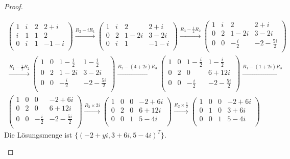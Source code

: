 \begin{proof}
	\begin{parts}
		\item 
			\begin{gather*}
			\left(
\begin{array}{ccc|c}
 1 & i & 2 & 2+i \\
 i & 1 & 1 & 2 \\
 0 & i & 1 & -1-i \\
\end{array}
\right) \xrightarrow{R_2-iR_1} \left(
\begin{array}{ccc|c}
 1 & i & 2 & 2+i \\
 0 & 2 & 1-2 i & 3-2 i \\
 0 & i & 1 & -1-i \\
\end{array}
\right) \xrightarrow{R_3-\frac{i}{2}R_2} \left(
\begin{array}{ccc|c}
 1 & i & 2 & 2+i \\
 0 & 2 & 1-2 i & 3-2 i \\
 0 & 0 & -\frac{i}{2} & -2-\frac{5 i}{2} \\
\end{array}
\right)\\ \xrightarrow{R_1-\frac{i}{2}R_2} \left(
\begin{array}{ccc|c}
 1 & 0 & 1-\frac{i}{2} & 1-\frac{i}{2} \\
 0 & 2 & 1-2 i & 3-2 i \\
 0 & 0 & -\frac{i}{2} & -2-\frac{5 i}{2} \\
\end{array}
\right) \xrightarrow{R_2-(4+2i)R_3} \left(
\begin{array}{ccc|c}
 1 & 0 & 1-\frac{i}{2} & 1-\frac{i}{2} \\
 0 & 2 & 0 & 6+12 i \\
 0 & 0 & -\frac{i}{2} & -2-\frac{5 i}{2} \\
\end{array}
\right) \xrightarrow{R_1-(1+2i)R_3}\\ \left(
\begin{array}{ccc|c}
 1 & 0 & 0 & -2+6 i \\
 0 & 2 & 0 & 6+12 i \\
 0 & 0 & -\frac{i}{2} & -2-\frac{5 i}{2} \\
\end{array}
\right) \xrightarrow{R_3\times 2 i} \left(
\begin{array}{ccc|c}
 1 & 0 & 0 & -2+6 i \\
 0 & 2 & 0 & 6+12 i \\
 0 & 0 & 1 & 5-4 i \\
\end{array}
\right) \xrightarrow{R_2\times \frac{1}{2}} \left(
\begin{array}{ccc|c}
 1 & 0 & 0 & -2+6 i \\
 0 & 1 & 0 & 3+6 i \\
 0 & 0 & 1 & 5-4 i \\
\end{array}
\right)	
			\end{gather*}
			Die Lösungsmenge ist $\{(-2+yi,3+6i,5-4i)^T\} $.


\end{parts}
\end{proof}
